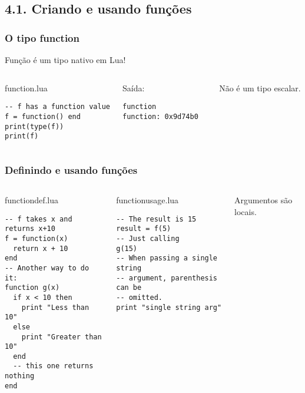 \documentclass[brazil]{beamer}
\begin{document}
\subsection{4.1. Criando e usando funções}
\begin{frame}[fragile]
  \frametitle{O tipo function}
  \pause
  \begin{center}
    Função é um tipo nativo em Lua!
  \end{center}
  \pause
  \begin{columns}
      \begin{block}{function.lua}
        \begin{lstlisting}
-- f has a function value
f = function() end
print(type(f))
print(f)
        \end{lstlisting}
      \end{block}
    \pause
      \begin{block}{Saída:}
        \begin{verbatim}
function
function: 0x9d74b0  \end{verbatim}
      \end{block}
      \pause
      Não é um tipo escalar.
  \end{columns}
\end{frame}
\begin{frame}[fragile]
  \frametitle{Definindo e usando funções}
  \pause
  \begin{columns}
      \begin{block}{functiondef.lua}
        \begin{lstlisting}
-- f takes x and returns x+10
f = function(x)
  return x + 10
end
-- Another way to do it:
function g(x)
  if x < 10 then
    print "Less than 10"
  else
    print "Greater than 10"
  end
  -- this one returns nothing
end
        \end{lstlisting}
      \end{block}
    \pause
      \begin{block}{functionusage.lua}
        \begin{lstlisting}
-- The result is 15
result = f(5)
-- Just calling
g(15)
-- When passing a single string
-- argument, parenthesis can be
-- omitted.
print "single string arg"
        \end{lstlisting}
      \end{block}
      \pause
      Argumentos são locais.
  \end{columns}
\end{frame}
\end{document}
